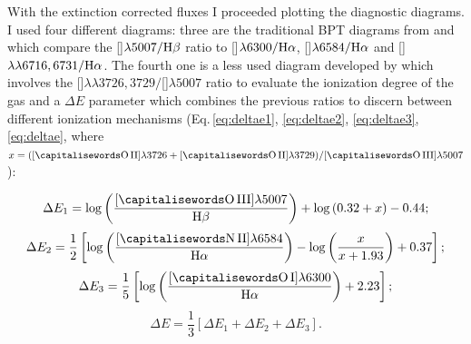 \documentclass[../main.tex]{subfiles}
\begin{document}
With the extinction corrected fluxes I proceeded plotting the diagnostic diagrams.
I used four different diagrams: three are the traditional BPT diagrams from \citet{Baldwin81} and \citet{Veilleux87} which compare the []$\lambda5007/\rm H\beta$ ratio to []$\lambda6300/\rm H\alpha$, []$\lambda6584/\rm H\alpha$ and []$\lambda\lambda6716,6731/\rm H\alpha$.
The fourth one is a less used diagram developed by \citet{Baldwin81} which involves the []$\lambda\lambda3726,3729/$[]$\lambda5007$ ratio to evaluate the ionization degree of the gas and a $\Delta E$ parameter which combines the previous ratios to discern between different ionization mechanisms (Eq.\,\ref{eq:deltae1}, \ref{eq:deltae2}, \ref{eq:deltae3}, \ref{eq:deltae}, where $x=([\rm \ion{O}{II}]\lambda3726+[\rm \ion{O}{II}]\lambda3729)/[\rm \ion{O}{III}]\lambda5007$):


\begin{equation}
\label{eq:deltae1}
\Delta E_1=\log\left(\frac{\rm[\ion{O}{III}]\lambda5007}{\rm \Hb}\right)+\log\left(0.32+x\right)-0.44;
\end{equation}
\begin{equation}
\label{eq:deltae2}
\Delta E_2= \frac{1}{2}\left[\log\left(\frac{\rm[\ion{N}{II}]\lambda6584}{\rm \Ha}\right)-\log\left(\frac{x}{x+1.93}\right) + 0.37\right];
\end{equation}
\begin{equation}
\label{eq:deltae3}
\Delta E_3=\frac{1}{5}\left[\log\left(\frac{\rm  [\ion{O}{I}]\lambda6300}{\rm \Ha}\right)+2.23\right];
\end{equation}
\begin{equation}
\label{eq:deltae}
\Delta E=\frac{1}{3}\left[\Delta E_1+\Delta E_2+\Delta E_3 \right].
\end{equation}
\end{document}

